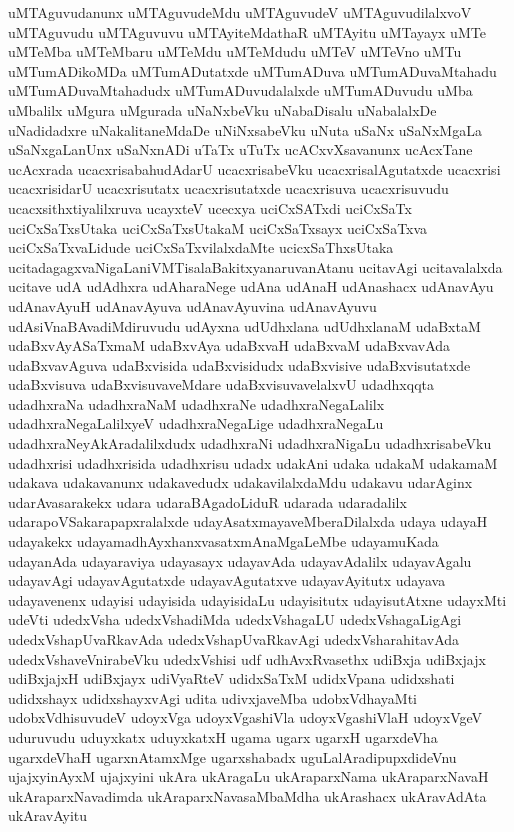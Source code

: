{uMTAguvudanunx
uMTAguvudeMdu
uMTAguvudeV
uMTAguvudilalxvoV
uMTAguvudu
uMTAguvuvu
uMTAyiteMdathaR
uMTAyitu
uMTayayx
uMTe
uMTeMba
uMTeMbaru
uMTeMdu
uMTeMdudu
uMTeV
uMTeVno
uMTu
uMTumADikoMDa
uMTumADutatxde
uMTumADuva
uMTumADuvaMtahadu
uMTumADuvaMtahadudx
uMTumADuvudalalxde
uMTumADuvudu
uMba
uMbalilx
uMgura
uMgurada
uNaNxbeVku
uNabaDisalu
uNabalalxDe
uNadidadxre
uNakalitaneMdaDe
uNiNxsabeVku
uNuta
uSaNx
uSaNxMgaLa
uSaNxgaLanUnx
uSaNxnADi
uTaTx
uTuTx
ucACxvXsavanunx
ucAcxTane
ucAcxrada
ucacxrisabahudAdarU
ucacxrisabeVku
ucacxrisalAgutatxde
ucacxrisi
ucacxrisidarU
ucacxrisutatx
ucacxrisutatxde
ucacxrisuva
ucacxrisuvudu
ucacxsithxtiyalilxruva
ucayxteV
ucecxya
uciCxSATxdi
uciCxSaTx
uciCxSaTxsUtaka
uciCxSaTxsUtakaM
uciCxSaTxsayx
uciCxSaTxva
uciCxSaTxvaLidude
uciCxSaTxvilalxdaMte
ucicxSaThxsUtaka
ucitadagagxvaNigaLaniVMTisalaBakitxyanaruvanAtanu
ucitavAgi
ucitavalalxda
ucitave
udA
udAdhxra
udAharaNege
udAna
udAnaH
udAnashacx
udAnavAyu
udAnavAyuH
udAnavAyuva
udAnavAyuvina
udAnavAyuvu
udAsiVnaBAvadiMdiruvudu
udAyxna
udUdhxlana
udUdhxlanaM
udaBxtaM
udaBxvAyASaTxmaM
udaBxvAya
udaBxvaH
udaBxvaM
udaBxvavAda
udaBxvavAguva
udaBxvisida
udaBxvisidudx
udaBxvisive
udaBxvisutatxde
udaBxvisuva
udaBxvisuvaveMdare
udaBxvisuvavelalxvU
udadhxqqta
udadhxraNa
udadhxraNaM
udadhxraNe
udadhxraNegaLalilx
udadhxraNegaLalilxyeV
udadhxraNegaLige
udadhxraNegaLu
udadhxraNeyAkAradalilxdudx
udadhxraNi
udadhxraNigaLu
udadhxrisabeVku
udadhxrisi
udadhxrisida
udadhxrisu
udadx
udakAni
udaka
udakaM
udakamaM
udakava
udakavanunx
udakavedudx
udakavilalxdaMdu
udakavu
udarAginx
udarAvasarakekx
udara
udaraBAgadoLiduR
udarada
udaradalilx
udarapoVSakarapapxralalxde
udayAsatxmayaveMberaDilalxda
udaya
udayaH
udayakekx
udayamadhAyxhanxvasatxmAnaMgaLeMbe
udayamuKada
udayanAda
udayaraviya
udayasayx
udayavAda
udayavAdalilx
udayavAgalu
udayavAgi
udayavAgutatxde
udayavAgutatxve
udayavAyitutx
udayava
udayavenenx
udayisi
udayisida
udayisidaLu
udayisitutx
udayisutAtxne
udayxMti
udeVti
udedxVsha
udedxVshadiMda
udedxVshagaLU
udedxVshagaLigAgi
udedxVshapUvaRkavAda
udedxVshapUvaRkavAgi
udedxVsharahitavAda
udedxVshaveVnirabeVku
udedxVshisi
udf
udhAvxRvasethx
udiBxja
udiBxjajx
udiBxjajxH
udiBxjayx
udiVyaRteV
udidxSaTxM
udidxVpana
udidxshati
udidxshayx
udidxshayxvAgi
udita
udivxjaveMba
udobxVdhayaMti
udobxVdhisuvudeV
udoyxVga
udoyxVgashiVla
udoyxVgashiVlaH
udoyxVgeV
uduruvudu
uduyxkatx
uduyxkatxH
ugama
ugarx
ugarxH
ugarxdeVha
ugarxdeVhaH
ugarxnAtamxMge
ugarxshabadx
uguLalAradipupxdideVnu
ujajxyinAyxM
ujajxyini
ukAra
ukAragaLu
ukAraparxNama
ukAraparxNavaH
ukAraparxNavadimda
ukAraparxNavasaMbaMdha
ukArashacx
ukAravAdAta
ukAravAyitu
}
